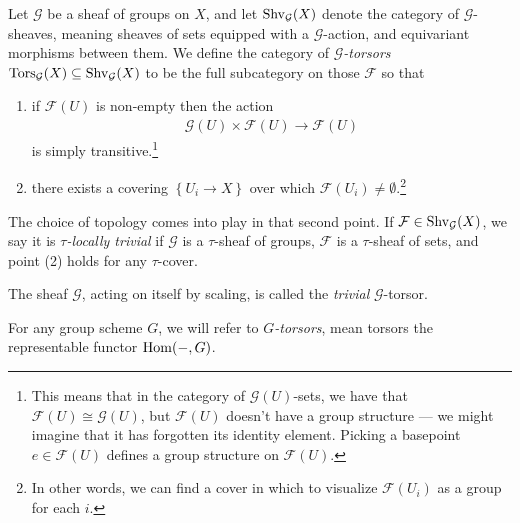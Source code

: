 \documentclass[11pt,openany]{book}
\begin{document}
\begin{definition}\label{def:torsor} 
\cite[03AH]{Stacks} Let $\mathcal{G}$ be a sheaf of groups on $X$, and let $\mathrm{Shv}_\mathcal{G}(X)$ denote the category of $\mathcal{G}$-sheaves, meaning sheaves of sets equipped with a $\mathcal{G}$-action, and equivariant morphisms between them. We define the category of $\mathcal{G}$\textit{-torsors} $\mathrm{Tors}_\mathcal{G}(X) \subseteq \mathrm{Shv}_\mathcal{G}(X)$ to be the full subcategory on those $\mathcal{F}$ so that
\begin{enumerate}
    \item if $\mathcal{F}(U)$ is non-empty then the action
    \begin{align*}
        \mathcal{G}(U) \times \mathcal{F}(U) \to \mathcal{F}(U)
    \end{align*}
    is simply transitive.\footnote{This means that in the category of $\mathcal{G}(U)$-sets, we have that $\mathcal{F}(U) \cong \mathcal{G}(U)$, but $\mathcal{F}(U)$ doesn't have a group structure --- we might imagine that it has forgotten its identity element. Picking a basepoint $e\in \mathcal{F}(U)$ defines a group structure on $\mathcal{F}(U)$.} 
    
    \item there exists a covering $\left\{ U_i \to X \right\}$ over which $\mathcal{F}(U_i) \ne \emptyset$.\footnote{In other words, we can find a cover in which to visualize $\mathcal{F}(U_i)$ as a group for each $i$.}
\end{enumerate}
\end{definition}

\begin{terminology} The choice of topology comes into play in that second point. If $\mathcal{F} \in \mathrm{Shv}_{\mathcal{G}}(X)$, we say it is $\tau$\textit{-locally trivial} if $\mathcal{G}$ is a $\tau$-sheaf of groups, $\mathcal{F}$ is a $\tau$-sheaf of sets, and point (2) holds for any $\tau$-cover.
\end{terminology}


\begin{example} The sheaf $\mathcal{G}$, acting on itself by scaling, is called the \textit{trivial} $\mathcal{G}$-torsor.
\end{example}

\begin{example} For any group scheme $G$, we will refer to $G$\textit{-torsors}, mean torsors the representable functor $\mathrm{Hom}(-,G)$.
\end{example}
\end{document}
